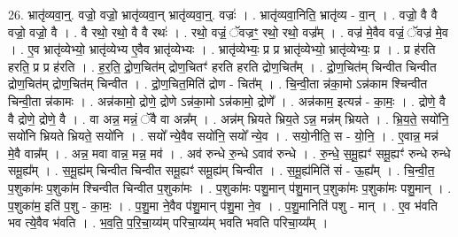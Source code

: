 \documentclass[17pt]{extarticle}
\begin{document}
26. भ्रातृ॑व्यवा॒न्॒. वज्रो॒ वज्रो॒ भ्रातृ॑व्यवा॒न् भ्रातृ॑व्यवा॒न्॒. वज्रः॑ । . भ्रातृ॑व्यवा॒निति॒ भ्रातृ॑व्य - वा॒न् । . वज्रो॒ वै वै वज्रो॒ वज्रो॒ वै । . वै रथो॒ रथो॒ वै वै रथः॑ । . रथो॒ वज्रं॒ ॅवज्रꣳ॒॒ रथो॒ रथो॒ वज्र᳚म् । . वज्र॑ मे॒वैव वज्रं॒ ॅवज्र॑ मे॒व । . ए॒व भ्रातृ॑व्येभ्यो॒ भ्रातृ॑व्येभ्य ए॒वैव भ्रातृ॑व्येभ्यः । . भ्रातृ॑व्येभ्यः॒ प्र प्र भ्रातृ॑व्येभ्यो॒ भ्रातृ॑व्येभ्यः॒ प्र । . प्र ह॑रति हरति॒ प्र प्र ह॑रति । . ह॒र॒ति॒ द्रो॒ण॒चित॑म् द्रोण॒चितꣳ॑ हरति हरति द्रोण॒चित᳚म् । . द्रो॒ण॒चित॑म् चिन्वीत चिन्वीत द्रोण॒चित॑म् द्रोण॒चित॑म् चिन्वीत । . द्रो॒ण॒चित॒मिति॑ द्रोण - चित᳚म् । . चि॒न्वी॒ता न्न॑का॒मो ऽन्न॑काम श्चिन्वीत चिन्वी॒ता न्न॑कामः । . अन्न॑कामो॒ द्रोणे॒ द्रोणे ऽन्न॑का॒मो ऽन्न॑कामो॒ द्रोणे᳚ । . अन्न॑काम॒ इत्यन्न॑ - का॒मः॒ । . द्रोणे॒ वै वै द्रोणे॒ द्रोणे॒ वै । . वा अन्न॒ मन्नं॒ ॅवै वा अन्न᳚म् । . अन्न॑म् भ्रियते भ्रिय॒ते ऽन्न॒ मन्न॑म् भ्रियते । . भ्रि॒य॒ते॒ सयो॑नि॒ सयो॑नि भ्रियते भ्रियते॒ सयो॑नि । . सयो᳚ न्ये॒वैव सयो॑नि॒ सयो᳚ न्ये॒व । . सयो॒नीति॒ स - यो॒नि॒ । . ए॒वान्न॒ मन्न॑ मे॒वै वान्न᳚म् । . अन्न॒ मवा वान्न॒ मन्न॒ मव॑ । . अव॑ रुन्धे रु॒न्धे ऽवाव॑ रुन्धे । . रु॒न्धे॒ स॒मू॒ह्यꣳ॑ समू॒ह्यꣳ॑ रुन्धे रुन्धे समू॒ह्य᳚म् । . स॒मू॒ह्य॑म् चिन्वीत चिन्वीत समू॒ह्यꣳ॑ समू॒ह्य॑म् चिन्वीत । . स॒मू॒ह्य॑मिति॑ सं - ऊ॒ह्य᳚म् । . चि॒न्वी॒त॒ प॒शुका॑मः प॒शुका॑म श्चिन्वीत चिन्वीत प॒शुका॑मः । . प॒शुका॑मः पशु॒मान् प॑शु॒मान् प॒शुका॑मः प॒शुका॑मः पशु॒मान् । . प॒शुका॑म॒ इति॑ प॒शु - का॒मः॒ । . प॒शु॒मा ने॒वैव प॑शु॒मान् प॑शु॒मा ने॒व । . प॒शु॒मानिति॑ पशु - मान् । . ए॒व भ॑वति भव त्ये॒वैव भ॑वति । . भ॒व॒ति॒ प॒रि॒चा॒य्य॑म् परिचा॒य्य॑म् भवति भवति परिचा॒य्य᳚म् । \newline
\end{document}
